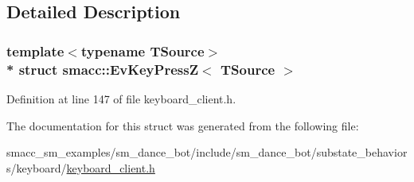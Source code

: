 \subsection{Detailed Description}
\subsubsection*{template$<$typename T\+Source$>$\\*
struct smacc\+::\+Ev\+Key\+Press\+Z$<$ T\+Source $>$}



Definition at line 147 of file keyboard\+\_\+client.\+h.



The documentation for this struct was generated from the following file\+:\begin{DoxyCompactItemize}
\item 
smacc\+\_\+sm\+\_\+examples/sm\+\_\+dance\+\_\+bot/include/sm\+\_\+dance\+\_\+bot/substate\+\_\+behaviors/keyboard/\hyperlink{keyboard__client_8h}{keyboard\+\_\+client.\+h}\end{DoxyCompactItemize}
